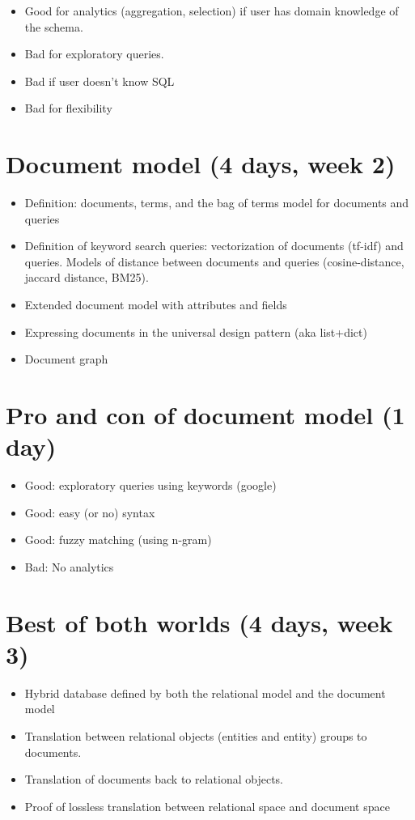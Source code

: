 	\begin{itemize}
		\item Good for analytics (aggregation, selection) if user has domain knowledge of the schema.
		\item Bad for exploratory queries.
		\item Bad if user doesn't know SQL
		\item Bad for flexibility
	\end{itemize}

		\section{Document model (4 days, week 2)}
	\begin{itemize}
		\item Definition: documents, terms, and the bag of terms model for documents and queries
		\item Definition of keyword search queries: vectorization of documents (tf-idf) and queries.	Models of distance between documents and queries (cosine-distance, jaccard distance, BM25).
		\item Extended document model with attributes and fields
		\item Expressing documents in the universal design pattern (aka list+dict)
		\item Document graph
	\end{itemize}

		\section{Pro and con of document model (1 day)}
	\begin{itemize}
		\item Good: exploratory queries using keywords (google)
		\item Good: easy (or no) syntax
		\item Good: fuzzy matching (using n-gram)
		\item Bad: No analytics
	\end{itemize}
		
		\section{Best of both worlds (4 days, week 3)}
	\begin{itemize}
		\item Hybrid database defined by both the relational model and the document model
		\item Translation between relational objects (entities and entity) groups to documents.
		\item Translation of documents back to relational objects.
		\item Proof of lossless translation between relational space and document space
	\end{itemize}